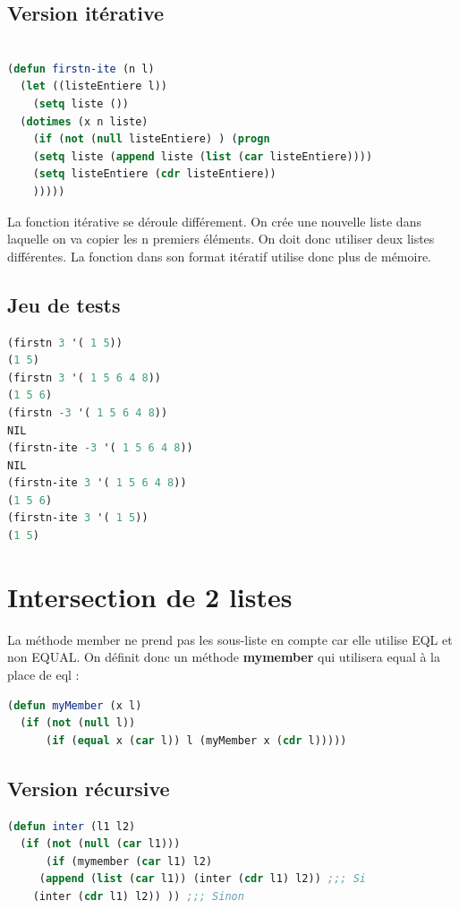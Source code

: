 \documentclass[a4paper,10pt]{report}
\begin{document}
    \subsection{Version itérative}
  \begin{lstlisting}[language=Lisp]
    
(defun firstn-ite (n l)
  (let ((listeEntiere l))
    (setq liste ())
  (dotimes (x n liste)
    (if (not (null listeEntiere) ) (progn 
    (setq liste (append liste (list (car listeEntiere))))
    (setq listeEntiere (cdr listeEntiere))
    )))))

  \end{lstlisting}
  
  La fonction itérative se déroule différement. On crée une nouvelle liste dans laquelle on va copier les n premiers éléments. 
  On doit donc utiliser deux listes différentes. La fonction dans son format itératif utilise donc plus de mémoire. 
	  \subsection{Jeu de tests}
	  	\begin{lstlisting}[language=Lisp]
(firstn 3 '( 1 5))
(1 5)
(firstn 3 '( 1 5 6 4 8))
(1 5 6)
(firstn -3 '( 1 5 6 4 8))
NIL
(firstn-ite -3 '( 1 5 6 4 8))
NIL
(firstn-ite 3 '( 1 5 6 4 8))
(1 5 6)
(firstn-ite 3 '( 1 5))
(1 5)
		 \end{lstlisting}

    \newpage
    \section{Intersection de 2 listes}
    
    La méthode member ne prend pas les sous-liste en compte car elle utilise EQL et non EQUAL. On définit donc un méthode \textbf{mymember} qui utilisera equal à la place de eql :
\begin{lstlisting}[language=Lisp]
(defun myMember (x l)
  (if (not (null l))
      (if (equal x (car l)) l (myMember x (cdr l)))))
\end{lstlisting}
    
    
      \subsection{Version récursive}
	\begin{lstlisting}[language=Lisp]
(defun inter (l1 l2)
  (if (not (null (car l1)))
      (if (mymember (car l1) l2)
	 (append (list (car l1)) (inter (cdr l1) l2)) ;;; Si
	(inter (cdr l1) l2)) )) ;;; Sinon
	
	
	\end{lstlisting}
\end{document}
